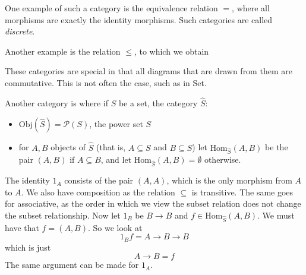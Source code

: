 \documentclass{report}
\begin{document}
\begin{examples}
\begin{example}[\label{exm:1.3.3}]
        One example of such a category is the equivalence relation $=$, where all morphisms are exactly the identity morphisms. Such categories are called \textit{discrete}.

        Another example is the relation $\leq $, to which we obtain
        \begin{center}
        \end{center}
        These categories are special in that all diagrams that are drawn from them are commutative. This is not often the case, such as in Set.
    \end{example}

    \begin{example}[\label{exm:1.3.4}]
        Another category is where if $S$ be a set, the category $\hat{S}$:
            \begin{itemize}
                \item $\text{Obj}(\hat{S}) = \mathcal{P}(S)$, the power set $S$

                \item for $A, B$ objects of $\hat{S}$ (that is, $A \subseteq S$ and $B \subseteq S$) let $\text{Hom}_{\hat{S}}(A, B)$ be the pair $(A, B)$ if $A \subseteq B$, and let $\text{Hom}_{\hat{S}}(A, B) = \emptyset$ otherwise. 
            \end{itemize}
            The identity $1_{A}$ consists of the pair $(A, A)$, which is the only morphism from $A$ to $A$. We also have composition as the relation $\subseteq $ is transitive. The same goes for associative, as the order in which we view the subset relation does not change the subset relationship. Now let $1_{B}$ be $B \rightarrow B$ and $f \in \text{Hom}_{\hat{S}}(A, B)$. We must have that $f = (A, B)$. So we look at 
            \begin{equation*}
                1_{B}f = A \rightarrow B \rightarrow B
            \end{equation*}
            which is just 
            \begin{equation*}
                A \rightarrow B = f
            \end{equation*}
            The same argument can be made for $1_{A}$.
    \end{example}


\end{examples}
\end{document}
